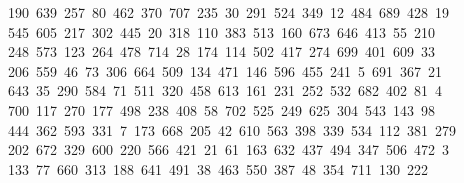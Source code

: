 \begin{tabbing}
\>\ 190\ 639\ 257\ 80\ 462\ 370\ 707\ 235\ 30\ 291\ 524\ 349\ 12\ 484\ 689\ 428\ 19\\[0pt]
\ 545\ 605\ 217\ 302\ 445\ 20\ 318\ 110\ 383\ 513\ 160\ 673\ 646\ 413\ 55\ 210\ \\[0pt]
\ 248\ 573\ 123\ 264\ 478\ 714\ 28\ 174\ 114\ 502\ 417\ 274\ 699\ 401\ 609\ 33\\[0pt]
\ 206\ 559\ 46\ 73\ 306\ 664\ 509\ 134\ 471\ 146\ 596\ 455\ 241\ 5\ 691\ 367\ 21\\[0pt]
\ 643\ 35\ 290\ 584\ 71\ 511\ 320\ 458\ 613\ 161\ 231\ 252\ 532\ 682\ 402\ 81\ 4\\[0pt]
\ 700\ 117\ 270\ 177\ 498\ 238\ 408\ 58\ 702\ 525\ 249\ 625\ 304\ 543\ 143\ 98\\[0pt]
\>\ 444\ 362\ 593\ 331\ 7\ 173\ 668\ 205\ 42\ 610\ 563\ 398\ 339\ 534\ 112\ 381\ 279\\[0pt]
\>\ 202\ 672\ 329\ 600\ 220\ 566\ 421\ 21\ 61\ 163\ 632\ 437\ 494\ 347\ 506\ 472\ 3\\[0pt]
\ 133\ 77\ 660\ 313\ 188\ 641\ 491\ 38\ 463\ 550\ 387\ 48\ 354\ 711\ 130\ 222\ \\[0pt]

\end{tabbing}
